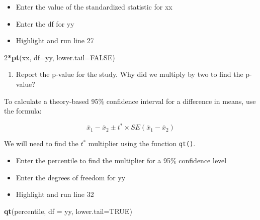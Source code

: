 \documentclass[
]{report}
\newenvironment{Shaded}{\begin{snugshade}}{\end{snugshade}}
\newcommand{\AttributeTok}[1]{\textcolor[rgb]{0.13,0.29,0.53}{#1}}
\newcommand{\ConstantTok}[1]{\textcolor[rgb]{0.56,0.35,0.01}{#1}}
\newcommand{\DecValTok}[1]{\textcolor[rgb]{0.00,0.00,0.81}{#1}}
\newcommand{\FunctionTok}[1]{\textcolor[rgb]{0.13,0.29,0.53}{\textbf{#1}}}
\newcommand{\NormalTok}[1]{#1}
\newcommand{\SpecialCharTok}[1]{\textcolor[rgb]{0.81,0.36,0.00}{\textbf{#1}}}
\providecommand{\tightlist}{%
  \setlength{\itemsep}{0pt}\setlength{\parskip}{0pt}}
\begin{document}
\vspace{0.2in}

\begin{itemize}
\item
  Enter the value of the standardized statistic for xx
\item
  Enter the df for yy
\item
  Highlight and run line 27
\end{itemize}

\begin{Shaded}
\begin{Highlighting}[]
\DecValTok{2}\SpecialCharTok{*}\FunctionTok{pt}\NormalTok{(xx, }\AttributeTok{df=}\NormalTok{yy, }\AttributeTok{lower.tail=}\ConstantTok{FALSE}\NormalTok{)}
\end{Highlighting}
\end{Shaded}

\vspace{0.3in}

\begin{enumerate}
\def\labelenumi{\arabic{enumi}.}
\setcounter{enumi}{7}
\tightlist
\item
  Report the p-value for the study. Why did we multiply by two to find the p-value?
\end{enumerate}

\vspace{0.5in}

To calculate a theory-based 95\% confidence interval for a difference in means, use the formula:

\[\bar{x}_1- \bar{x}_2\pm t^* \times SE(\bar{x}_1- \bar{x}_2)\]

We will need to find the \(t^*\) multiplier using the function \texttt{qt()}.

\begin{itemize}
\item
  Enter the percentile to find the multiplier for a 95\% confidence level
\item
  Enter the degrees of freedom for yy
\item
  Highlight and run line 32
\end{itemize}

\begin{Shaded}
\begin{Highlighting}[]
\FunctionTok{qt}\NormalTok{(percentile, }\AttributeTok{df =}\NormalTok{ yy, }\AttributeTok{lower.tail=}\ConstantTok{TRUE}\NormalTok{)}
\end{Highlighting}
\end{Shaded}
\end{document}
